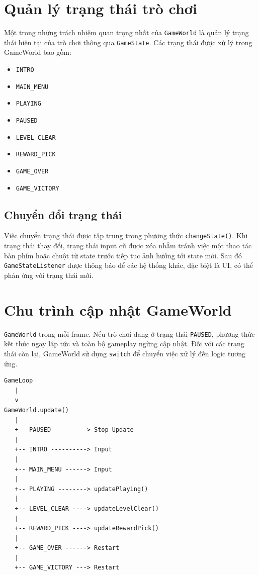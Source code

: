 \documentclass[12pt,a4paper]{report}
\begin{document}
    \section{Quản lý trạng thái trò chơi}
    Một trong những trách nhiệm quan trọng nhất của
    \texttt{GameWorld} là quản lý trạng thái hiện tại của trò chơi
    thông qua \texttt{GameState}.
    Các trạng thái được xử lý trong GameWorld bao gồm:
    \begin{itemize}
        \item \texttt{INTRO}
        \item \texttt{MAIN\_MENU}
        \item \texttt{PLAYING}
        \item \texttt{PAUSED}
        \item \texttt{LEVEL\_CLEAR}
        \item \texttt{REWARD\_PICK}
        \item \texttt{GAME\_OVER}
        \item \texttt{GAME\_VICTORY}
    \end{itemize}

    \subsection{Chuyển đổi trạng thái}
    Việc chuyển trạng thái được tập trung trong phương thức
    \texttt{changeState()}.
    Khi trạng thái thay đổi, trạng thái input cũ được xóa nhằm tránh
    việc một thao tác bàn phím hoặc chuột từ state trước tiếp tục
    ảnh hưởng tới state mới.
    Sau đó \texttt{GameStateListener} được thông báo để các hệ thống
    khác, đặc biệt là UI, có thể phản ứng với trạng thái mới.


    \section{Chu trình cập nhật GameWorld}
    \texttt{GameWorld} trong mỗi frame.
    Nếu trò chơi đang ở trạng thái \texttt{PAUSED}, phương thức
    kết thúc ngay lập tức và toàn bộ gameplay ngừng cập nhật.
    Đối với các trạng thái còn lại, GameWorld sử dụng
    \texttt{switch} để chuyển việc xử lý đến logic tương ứng.
    \begin{verbatim}
GameLoop
   |
   v
GameWorld.update()
   |
   +-- PAUSED ---------> Stop Update
   |
   +-- INTRO ----------> Input
   |
   +-- MAIN_MENU ------> Input
   |
   +-- PLAYING --------> updatePlaying()
   |
   +-- LEVEL_CLEAR ----> updateLevelClear()
   |
   +-- REWARD_PICK ----> updateRewardPick()
   |
   +-- GAME_OVER ------> Restart
   |
   +-- GAME_VICTORY ---> Restart
    \end{verbatim}
\end{document}
